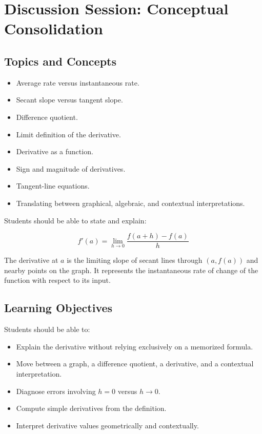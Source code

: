 \documentclass{article}
\begin{document}
\section*{Discussion Session: Conceptual Consolidation}

\subsection*{Topics and Concepts}

\begin{itemize}
    \item Average rate versus instantaneous rate.
    \item Secant slope versus tangent slope.
    \item Difference quotient.
    \item Limit definition of the derivative.
    \item Derivative as a function.
    \item Sign and magnitude of derivatives.
    \item Tangent-line equations.
    \item Translating between graphical, algebraic, and contextual interpretations.
\end{itemize}

\begin{tcolorbox}[title=Key Definitions]
Students should be able to state and explain:

\[
\boxed{
f'(a)=
\lim_{h\to0}
\frac{f(a+h)-f(a)}{h}
}
\]

The derivative at $a$ is the limiting slope of secant lines through $(a,f(a))$ and nearby points on the graph. It represents the instantaneous rate of change of the function with respect to its input.
\end{tcolorbox}

\subsection*{Learning Objectives}

Students should be able to:

\begin{itemize}
    \item Explain the derivative without relying exclusively on a memorized formula.
    \item Move between a graph, a difference quotient, a derivative, and a contextual interpretation.
    \item Diagnose errors involving $h=0$ versus $h\to0$.
    \item Compute simple derivatives from the definition.
    \item Interpret derivative values geometrically and contextually.
\end{itemize}
\end{document}

